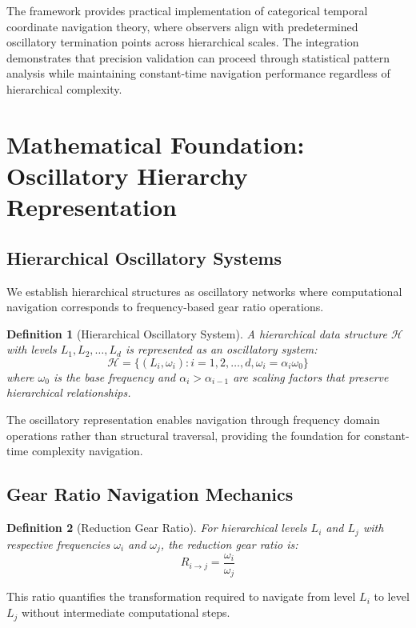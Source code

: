 \documentclass[12pt,a4paper]{article}
\newtheorem{definition}{Definition}
\begin{document}
The framework provides practical implementation of categorical temporal coordinate navigation theory, where observers align with predetermined oscillatory termination points across hierarchical scales. The integration demonstrates that precision validation can proceed through statistical pattern analysis while maintaining constant-time navigation performance regardless of hierarchical complexity.

\section{Mathematical Foundation: Oscillatory Hierarchy Representation}

\subsection{Hierarchical Oscillatory Systems}

We establish hierarchical structures as oscillatory networks where computational navigation corresponds to frequency-based gear ratio operations.

\begin{definition}[Hierarchical Oscillatory System]
A hierarchical data structure $\mathcal{H}$ with levels $L_1, L_2, \ldots, L_d$ is represented as an oscillatory system:
$$\mathcal{H} = \{(L_i, \omega_i) : i = 1, 2, \ldots, d, \omega_i = \alpha_i \omega_0\}$$
where $\omega_0$ is the base frequency and $\alpha_i > \alpha_{i-1}$ are scaling factors that preserve hierarchical relationships.
\end{definition}

The oscillatory representation enables navigation through frequency domain operations rather than structural traversal, providing the foundation for constant-time complexity navigation.

\subsection{Gear Ratio Navigation Mechanics}

\begin{definition}[Reduction Gear Ratio]
For hierarchical levels $L_i$ and $L_j$ with respective frequencies $\omega_i$ and $\omega_j$, the reduction gear ratio is:
$$R_{i \to j} = \frac{\omega_i}{\omega_j}$$
\end{definition}

This ratio quantifies the transformation required to navigate from level $L_i$ to level $L_j$ without intermediate computational steps.
\end{document}
